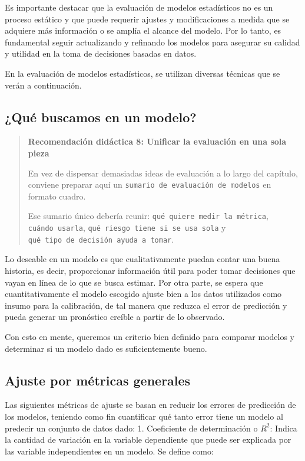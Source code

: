 \documentclass[
]{book}
\begin{document}
Es importante destacar que la evaluación de modelos estadísticos no es
un proceso estático y que puede requerir ajustes y modificaciones a
medida que se adquiere más información o se amplía el alcance del
modelo. Por lo tanto, es fundamental seguir actualizando y refinando los
modelos para asegurar su calidad y utilidad en la toma de decisiones
basadas en datos.

En la evaluación de modelos estadísticos, se utilizan diversas técnicas
que se verán a continuación.

\subsection{¿Qué buscamos en un modelo?}\label{quuxe9-buscamos-en-un-modelo-1}

\begin{quote}
\textbf{Recomendación didáctica 8: Unificar la evaluación en una sola pieza}

En vez de dispersar demasiadas ideas de evaluación a lo largo del
capítulo, conviene preparar aquí un \texttt{sumario\ de\ evaluación\ de\ modelos}
en formato cuadro.

Ese sumario único debería reunir: \texttt{qué\ quiere\ medir\ la\ métrica},
\texttt{cuándo\ usarla}, \texttt{qué\ riesgo\ tiene\ si\ se\ usa\ sola} y \texttt{qué\ tipo\ de\ decisión\ ayuda\ a\ tomar}.
\end{quote}

Lo deseable en un modelo es que cualitativamente puedan contar una buena
historia, es decir, proporcionar información útil para poder tomar
decisiones que vayan en línea de lo que se busca estimar. Por otra
parte, se espera que cuantitativamente el modelo escogido ajuste bien a
los datos utilizados como insumo para la calibración, de tal manera que
reduzca el error de predicción y pueda generar un pronóstico creíble a
partir de lo observado.

Con esto en mente, queremos un criterio bien definido para comparar
modelos y determinar si un modelo dado es suficientemente bueno.

\subsection{Ajuste por métricas generales}\label{ajuste-por-muxe9tricas-generales-1}

Las siguientes métricas de ajuste se basan en reducir los errores de
predicción de los modelos, teniendo como fin cuantificar qué tanto error
tiene un modelo al predecir un conjunto de datos dado: 1. Coeficiente de
determinación o \(R^2\): Indica la cantidad de variación en la variable
dependiente que puede ser explicada por las variable independientes en
un modelo. Se define como:
\end{document}

